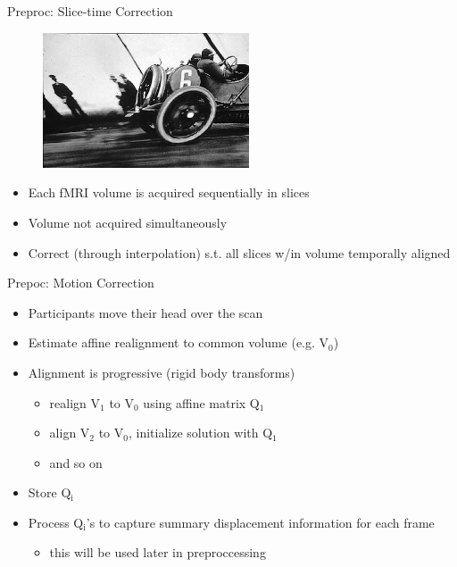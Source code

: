 \documentclass[presentation]{beamer}
\begin{document}
\begin{frame}[label={sec:orgheadline10}]{Preproc: Slice-time Correction}
\begin{figure}[htb]
\centering
\includegraphics[height=4cm]{./Figures/rollingshuttercar.jpg}
\end{figure}
\begin{itemize}
\item Each fMRI volume is acquired sequentially in slices
\item Volume not acquired simultaneously
\item Correct (through interpolation) s.t. all slices w/in volume temporally aligned
\end{itemize}
\end{frame}
\begin{frame}[label={sec:orgheadline11}]{Prepoc: Motion Correction}
\begin{itemize}
\item Participants move their head over the scan
\item Estimate affine realignment to common volume (e.g. V\(_{\text{0}}\))
\item Alignment is progressive (rigid body transforms)
\begin{itemize}
\item realign V\(_{\text{1}}\) to V\(_{\text{0}}\) using affine matrix Q\(_{\text{1}}\)
\item align V\(_{\text{2}}\) to V\(_{\text{0}}\), initialize solution with Q\(_{\text{1}}\)
\item and so on
\end{itemize}
\item Store Q\(_{\text{i}}\)
\item Process Q\(_{\text{i}}\)'s to capture summary displacement information for each frame
\begin{itemize}
\item this will be used later in preproccessing
\end{itemize}
\end{itemize}
\end{frame}
\end{document}

